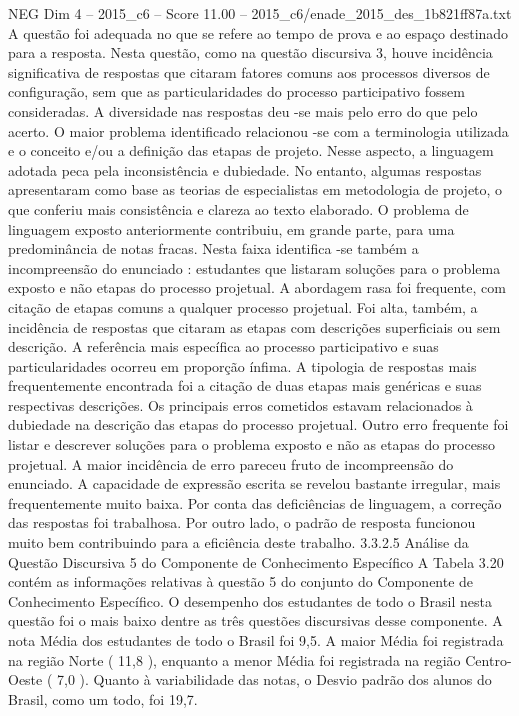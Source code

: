 \begin{textsample}{NEG Dim 4 – 2015\_c6 – Score 11.00 – 2015\_c6/enade\_2015\_des\_1b821ff87a.txt}
A questão foi adequada no que se refere ao tempo de prova e ao espaço destinado para a resposta.
Nesta questão, como na questão discursiva 3, houve incidência significativa de respostas que citaram fatores comuns aos processos diversos de configuração, sem que as particularidades do processo participativo fossem consideradas.
A diversidade nas respostas deu -se mais pelo erro do que pelo acerto.
O maior problema identificado relacionou -se com a terminologia utilizada e o conceito e/ou a definição das etapas de projeto.
Nesse aspecto, a linguagem adotada peca pela inconsistência e dubiedade.
No entanto, algumas respostas apresentaram como base as teorias de especialistas em metodologia de projeto, o que conferiu mais consistência e clareza ao texto elaborado.
O problema de linguagem exposto anteriormente contribuiu, em grande parte, para uma predominância de notas fracas.
Nesta faixa identifica -se também a incompreensão do enunciado : estudantes que listaram soluções para o problema exposto e não etapas do processo projetual.
A abordagem rasa foi frequente, com citação de etapas comuns a qualquer processo projetual.
Foi alta, também, a incidência de respostas que citaram as etapas com descrições superficiais ou sem descrição.
A referência mais específica ao processo participativo e suas particularidades ocorreu em proporção ínfima.
A tipologia de respostas mais frequentemente encontrada foi a citação de duas etapas mais genéricas e suas respectivas descrições.
Os principais erros cometidos estavam relacionados à dubiedade na descrição das etapas do processo projetual.
Outro erro frequente foi listar e descrever soluções para o problema exposto e não as etapas do processo projetual.
A maior incidência de erro pareceu fruto de incompreensão do enunciado.
A capacidade de expressão escrita se revelou bastante irregular, mais frequentemente muito baixa.
Por conta das deficiências de linguagem, a correção das respostas foi trabalhosa.
Por outro lado, o padrão de resposta funcionou muito bem contribuindo para a eficiência deste trabalho. 3.3.2.5 Análise da Questão Discursiva 5 do Componente de Conhecimento Específico A Tabela 3.20 contém as informações relativas à questão 5 do conjunto do Componente de Conhecimento Específico.
O desempenho dos estudantes de todo o Brasil nesta questão foi o mais baixo dentre as três questões discursivas desse componente.
A nota Média dos estudantes de todo o Brasil foi 9,5.
A maior Média foi registrada na região Norte ( 11,8 ), enquanto a menor Média foi registrada na região Centro-Oeste ( 7,0 ).
Quanto à variabilidade das notas, o Desvio padrão dos alunos do Brasil, como um todo, foi 19,7.

\end{textsample}
